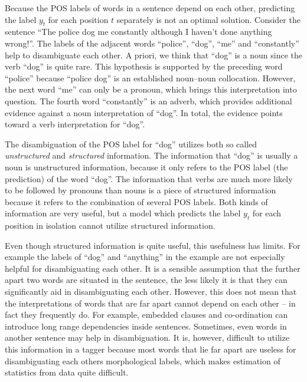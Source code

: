 Because the POS labels of words in a sentence depend on each other,
predicting the label $y_t$ for each position $t$ separately is not an
optimal solution. Consider the sentence ``The police dog me constantly although I
haven't done anything wrong!''. The labels of the adjacent words
``police'', ``dog'', ``me'' and ``constantly'' help to disambiguate
each other. A priori, we think that ``dog'' is a noun since the verb
``dog'' is quite rare. This hypothesis is supported by the preceding
word ``police'' because ``police dog'' is an established noun--noun
collocation. However, the next word ``me'' can only be a pronoun,
which brings this interpretation into question. The fourth word
``constantly'' is an adverb, which provides additional evidence
against a noun interpretation of ``dog''. In total, the evidence
points toward a verb interpretation for ``dog''.

The disambiguation of the POS label for ``dog'' utilizes both so
called {\it unstructured} and {\it structured} information. The
information that ``dog'' is usually a noun is
unstructured information, because it only refers to the POS label (the
prediction) of the word ``dog''. The information that verbs are much
more likely to be followed by pronouns than nouns is a piece of
structured information because it refers to the combination of several
POS labels. Both kinds of information are very useful, but a model
which predicts the label $y_t$ for each position in isolation cannot
utilize structured information.

Even though structured information is quite useful, this usefulness
has limits. For example the labels of ``dog'' and ``anything'' in the
example are not especially helpful for disambiguating each other. It
is a sensible assumption that the further apart two words are situated
in the sentence, the less likely it is that they can significantly aid
in disambiguating each other. However, this does not mean that the
interpretations of words that are far apart cannot depend on each
other -- in fact they frequently do. For example, embedded clauses and
co-ordination can introduce long range dependencies inside
sentences. Sometimes, even words in another sentence may help in
disambiguation. It is, however, difficult to utilize this information
in a tagger because most words that lie far apart are useless for
disambiguating each others morphological labels, which makes
estimation of statistics from data quite difficult.

